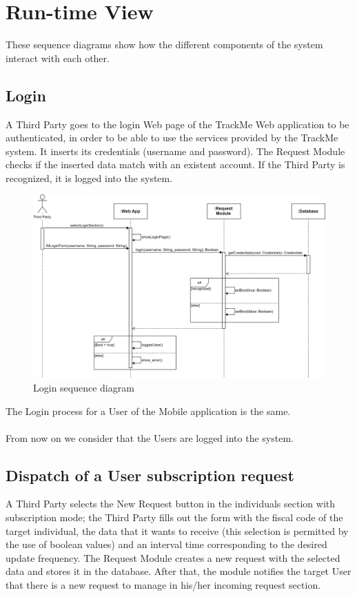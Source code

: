 \section{Run-time View}
These sequence diagrams show how the different components of the system interact with each other.

\subsection{Login}
A Third Party goes to the login Web page of the TrackMe Web application to be authenticated, in order to be able to use the services provided by the TrackMe system. It inserts its credentials (username and password). The Request Module checks if the inserted data match with an existent account. If the Third Party is recognized, it is logged into the system.

\begin{figure}[H]

    \centering
    \includegraphics[scale=0.15]{./Pictures/login.png}
    \caption{Login sequence diagram}
    
\end{figure}

The Login process for a User of the Mobile application is the same.\\ \\
From now on we consider that the Users are logged into the system.

\subsection{Dispatch of a User subscription request}
A Third Party selects the New Request button in the individuals section with subscription mode; the Third Party fills out the form with the fiscal code of the target individual, the data that it wants to receive (this selection is permitted by the use of boolean values) and an interval time corresponding to the desired update frequency. The Request Module creates a new request with the selected data and stores it in the database. After that, the module notifies the target User that there is a new request to manage in his/her incoming request section.


